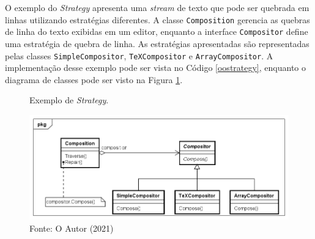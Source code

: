O exemplo do \textit{Strategy} apresenta uma \textit{stream} 
de texto que pode ser quebrada em linhas utilizando 
estratégias diferentes. A classe \texttt{Composition} 
gerencia as quebras de linha do texto exibidas em 
um editor, enquanto a interface \texttt{Compositor} define 
uma estratégia de quebra de linha. As estratégias 
apresentadas são representadas pelas classes 
\texttt{SimpleCompositor}, \texttt{TeXCompositor} e \texttt{ArrayCompositor}. 
A implementação desse exemplo pode ser vista no Código 
\ref{oostrategy}, enquanto o diagrama de classes pode 
ser visto na Figura \ref{strategy_exemplo}.

\begin{figure}[htb]
	\caption{\label{strategy_exemplo}Exemplo de \textit{Strategy}.}
	\begin{center}
	    \includegraphics[scale=0.5]{5_padroes-contexto-funcional/5.3_comportamentais/5.3.09_strategy/strategy_exemplo.png}
	\end{center}
  \caption*{Fonte: O Autor (2021)}
\end{figure}

